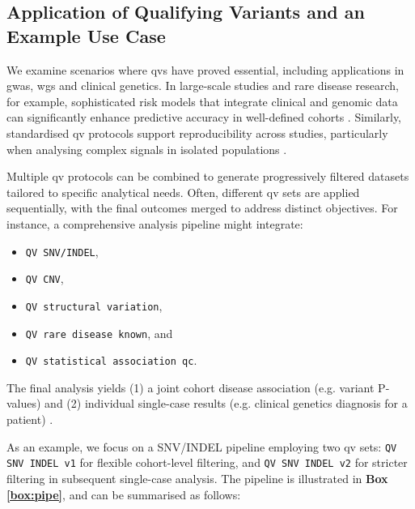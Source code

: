 \subsection{Application of Qualifying Variants and an Example Use Case}\label{sec:example_high_level}

We examine scenarios where \ac{qv}s have proved essential, including applications in \ac{gwas}, \ac{wgs} and clinical genetics. In large-scale studies and rare disease research, for example, sophisticated risk models that integrate clinical and genomic data can significantly enhance predictive accuracy in well-defined cohorts \cite{riveros2021integrated, weale2021validation, sun2021polygenic}. Similarly, standardised \ac{qv} protocols support reproducibility across studies, particularly when analysing complex signals in isolated populations \cite{lim2014distribution}.

Multiple \ac{qv} protocols can be combined to generate progressively filtered datasets tailored to specific analytical needs. Often, different \ac{qv} sets are applied sequentially, with the final outcomes merged to address distinct objectives. For instance, a comprehensive analysis pipeline might integrate:
\begin{itemize}
  \item \colorbox{kispiblue!30}{\texttt{QV SNV/INDEL}},
  \item \colorbox{kispiblue!30}{\texttt{QV CNV}},
  \item \colorbox{kispiblue!30}{\texttt{QV structural variation}},
  \item \colorbox{kispiblue!30}{\texttt{QV rare disease known}}, and 
  \item \colorbox{kispiblue!30}{\texttt{QV statistical association \ac{qc}}}.
\end{itemize}
The final analysis yields (1) a joint cohort disease association (e.g. variant P-values) and (2) individual single-case results (e.g. clinical genetics diagnosis for a patient)
\cite{auwera_genomics_2020, li2025statistical}.

As an example, we focus on a SNV/INDEL pipeline employing two \ac{qv} sets:
\colorbox{colorSUNSET2!60}{\texttt{QV SNV INDEL v1}} for flexible cohort-level filtering, and 
\colorbox{colorSUNSET2!60}{\texttt{QV SNV INDEL v2}} for stricter filtering in subsequent single-case analysis. The pipeline is illustrated in \textbf{Box \ref{box:pipe}}, and can be summarised as follows:


